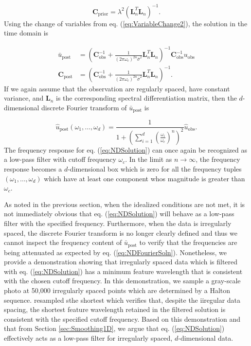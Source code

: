 \documentclass[10pt,a4paper]{article}
\begin{document}
\begin{equation}\label{eq:NDCovariance}
\mathbf{C}_\mathrm{prior} = \lambda^2\left(\mathbf{L}_n^T\mathbf{L}_n\right)^{-1}. 
\end{equation}           
Using the change of variables from eq. (\ref{eq:VariableChange2}), the solution in the time domain is

\begin{equation}\label{eq:NDSolution}
\begin{split}
\bar{u}_\mathrm{post} &= (\mathbf{C}_\mathrm{obs}^{-1} +   
                   \frac{1}{(2\pi\omega_c)^{2n}\bar{\sigma}^2}\mathbf{L}_n^T\mathbf{L}_n)^{-1}\mathbf{C}_\mathrm{obs}^{-1}
                   u_\mathrm{obs}
\\
\mathbf{C}_\mathrm{post} &= (\mathbf{C}_\mathrm{obs}^{-1} +   
                            \frac{1}{(2\pi\omega_c)^{2n}\bar{\sigma}^2}\mathbf{L}_n^T\mathbf{L}_n)^{-1}.
\end{split}
\end{equation}
If we again assume that the observation are regularly spaced, have constant variance, and $\mathbf{L}_n$ is the corresponding spectral differentiation matrix, then the $d$-dimensional discrete Fourier transform of $\bar{u}_\mathrm{post}$ is 

\begin{equation}\label{eq:NDFourierSoln}
  \hat{u}_\mathrm{post}(\omega_1, \dots, \omega_d) = 
  \frac{1}{1 + \left(\sum_{i=1}^d \left(\frac{\omega_i}{\omega_c}\right)^n\right)^2} \hat{u}_\mathrm{obs}.
\end{equation}
The frequency response for eq. (\ref{eq:NDSolution}) can once again be recognized as a low-pass filter with cutoff frequency $\omega_c$.  In the limit as $n \to \infty$, the frequency response becomes a $d$-dimensional box which is zero for all the frequency tuples $(\omega_1,\dots,\omega_d)$ which have at least one component whos magnitude is greater than $\omega_c$.

As noted in the previous section, when the idealized conditions are not met, it is not immediately obvious that eq. (\ref{eq:NDSolution}) will behave as a low-pass filter with the specified frequency. Furthermore, when the data is irregularly spaced, the discrete Fourier transform is no longer clearly defined and thus we cannot inspect the frequency content of $\bar{u}_\mathrm{post}$ to verify that the frequencies are being attenuated as expected by eq. (\ref{eq:NDFourierSoln}). Nonetheless, we provide a demonstration showing that irregularly spaced data which is filtered with eq. (\ref{eq:NDSolution}) has a minimum feature wavelength that is consistent with the chosen cutoff frequency.  In this demonstration, we sample a gray-scale photo at 50,000 irregularly spaced points which are determined by a Halton sequence. resampled sthe shortest  which verifies that, despite the iiregular data spacing, the shortest feature wavelength retained in the filtered solution is consistent with the specified cutoff frequency.  Based on this demonstration and that from Section \ref{sec:Smoothing1D}, we argue that eq. (\ref{eq:NDSolution}) effectively acts as a low-pass filter for irregularly spaced, $d$-dimensional data.
\end{document}
